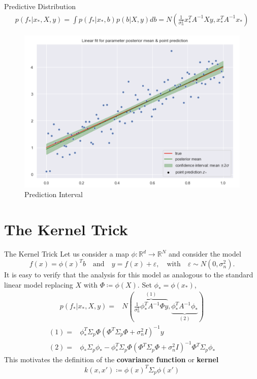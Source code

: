 \documentclass[10pt]{beamer}
\begin{document}
\begin{frame}{Predictive Distribution}{\cite[Chapter 2]{RW05}}
\begin{align*}
p(f_*|x_*, X, y) 
= \int p(f_*|x_*, b)p(b|X, y)db 
= N\left(
\frac{1}{\sigma_n^2}x_*^T A^{-1}Xy, x_*^T A^{-1}x_*
\right)
\end{align*}

\begin{center}
\begin{figure}
\includegraphics[scale=0.27]{images/lin_prediction.png} 
\caption{Prediction Interval}
\end{figure}
\end{center}
\end{frame}


\section{The Kernel Trick}


\begin{frame}{The Kernel Trick}
Let us consider a map $\phi: \mathbb{R}^d \longrightarrow \mathbb{R}^N$ and consider the model
$$
f(x) = \phi(x)^T b \quad \text{and} \quad y = f(x) + \varepsilon, \quad \text{with} \quad \varepsilon \sim N(0, \sigma_n^2). 
$$
It is easy to verify that the analysis for this model as analogous to the standard linear model replacing $X$ with $\Phi\coloneqq \phi(X)$. Set $\phi_*= \phi(x_*)$, 
\begin{align*}
p(f_*|x_*, X, y) =& N\left(
\overbrace{\frac{1}{\sigma_n^2}\phi_*^T A^{-1}\Phi y}^{(1)},
\underbrace{ \phi_*^T A^{-1}\phi_*}_{(2)}
\right)
\end{align*}
\begin{align*}
(1) =& \phi_{*}^T \Sigma_{p}\Phi(\Phi^T \Sigma_p \Phi + \sigma_n^2I)^{-1}y \\
(2)= &\phi_{*}\Sigma_p\phi_{*} - \phi_{*}^T \Sigma_{p}\Phi(\Phi^T \Sigma_p \Phi + \sigma_n^2I)^{-1}\Phi^T\Sigma_p\phi_*
\end{align*}
This motivates the definition of the {\bf covariance function} or {\bf kernel}
$$
k(x, x')\coloneqq \phi(x)^T\Sigma_p\phi(x')
$$
\end{frame}
\end{document}
